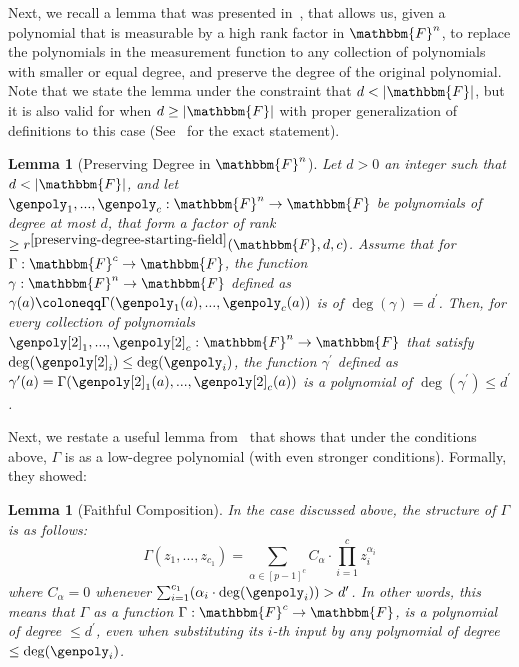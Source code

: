 \documentclass[10pt,a4paper]{article}
\newtheorem{lemma}[theorem]{Lemma}
\newcommand{\definedas}[0]{\coloneqq}
\newcommand{\sparens}[1]{\left[ #1 \right]}
\newcommand{\basefield}[0]{\mathbbm{F}}
\newcommand{\blocklength}[0]{n}
\newcommand{\field}[0]{\basefield^{\blocklength}}
\newcommand{\degree}[0]{d}
\newcommand{\basefieldsize}[0]{p}
\newcommand{\funcdef}[3]{#1:#2\rightarrow#3}
\newcommand{\rankfunc}[0]{{{{r}}}}
\newcommand{\abs}[1]{\left| #1 \right|}
\begin{document}
Next, we recall a lemma that was presented in~\cite[Theorem 4.1]{bhattacharyya2013locally}, that allows us, given a polynomial that is measurable by a high rank factor in $\field$,
to replace the polynomials in the measurement function to any collection of polynomials with smaller or equal degree, and preserve the degree of the original polynomial.
Note that we state the lemma under the constraint that $\degree < \abs{\basefield}$, but it is also valid for when $\degree \geq \abs{\basefield}$ with proper generalization of definitions to this case (See~\cite[Theorem 4.1]{bhattacharyya2013locally} for the exact statement).
\begin{lemma}[Preserving Degree in $\field$]\label{preserving-degree-starting-field}
Let $\degree>0$ an integer such that $\degree < \abs{\basefield}$, and let $\funcdef{\genpoly_1,...,\genpoly_c}{\field}{\basefield}$ be polynomials of degree at most $\degree$, that form a factor of rank $\geq  \rankfunc^{\ref{preserving-degree-starting-field}}(\basefield, \degree, c)$.
Assume that for $\funcdef{\Gamma}{\basefield^{c}}{\basefield}$, the function $\funcdef{\gamma}{\field}{\basefield}$ defined as $\gamma(a) \definedas \Gamma(\genpoly_1(a),...,\genpoly_c(a))$ is of $\deg(\gamma)=\degree^{\prime}$.
\newline
Then, for every collection of polynomials $\funcdef{\genpoly[2]_1,...,\genpoly[2]_c}{\field}{\basefield}$ that satisfy $\deg(\genpoly[2]_i) \leq \deg(\genpoly_{i})$,
the function $\gamma^{\prime}$ defined as $\gamma^{\prime}(a)=\Gamma(\genpoly[2]_1(a),...,\genpoly[2]_c(a))$ is a polynomial of $\deg(\gamma^{\prime})\leq\degree^{\prime}$.
\end{lemma}
Next, we restate a useful lemma from~\cite[Lemma 4.17]{DBLP:journals/corr/0001L15} that shows that under the conditions
above, $\Gamma$ is as a low-degree polynomial (with even stronger conditions).
Formally, they showed:
\begin{lemma}[Faithful Composition]
    In the case discussed above, the structure of $\Gamma$ is as follows:
    \[
        \Gamma(z_1,...,z_{c_1})  =
        \sum_{\alpha \in \sparens{\basefieldsize - 1}^{c}} {{C_{\alpha}} \cdot {\prod_{i = 1}^{c}}{z_i^{\alpha_i}}}
    \]
    where $C_{\alpha} = 0$ whenever $\sum_{i = 1}^{c_1}(\alpha_i \cdot \deg(\genpoly_i)) > \degree^\prime$.
    \newline
    In other words, this means that $\Gamma$ as a function $\funcdef{\Gamma}{\basefield^{c}}{\basefield}$,
    is a polynomial of degree $\leq \degree^{\prime}$, even when substituting its $i$-th input by any polynomial of degree $\leq \deg(\genpoly_i)$.
\end{lemma}
\end{document}
